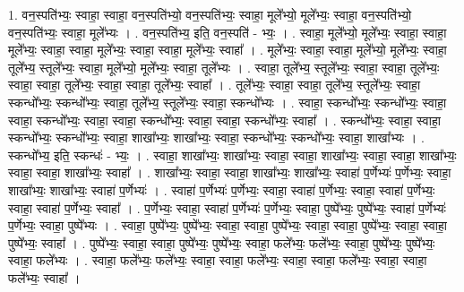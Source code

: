 \documentclass[17pt]{extarticle}
\begin{document}
1. वन॒स्पति॑भ्यः॒ स्वाहा॒ स्वाहा॒ वन॒स्पति॑भ्यो॒ वन॒स्पति॑भ्यः॒ स्वाहा॒ मूले᳚भ्यो॒ मूले᳚भ्यः॒ स्वाहा॒ वन॒स्पति॑भ्यो॒ वन॒स्पति॑भ्यः॒ स्वाहा॒ मूले᳚भ्यः । . वन॒स्पति॑भ्य॒ इति॒ वन॒स्पति॑ - भ्यः॒ । . स्वाहा॒ मूले᳚भ्यो॒ मूले᳚भ्यः॒ स्वाहा॒ स्वाहा॒ मूले᳚भ्यः॒ स्वाहा॒ स्वाहा॒ मूले᳚भ्यः॒ स्वाहा॒ स्वाहा॒ मूले᳚भ्यः॒ स्वाहा᳚ । . मूले᳚भ्यः॒ स्वाहा॒ स्वाहा॒ मूले᳚भ्यो॒ मूले᳚भ्यः॒ स्वाहा॒ तूले᳚भ्य॒ स्तूले᳚भ्यः॒ स्वाहा॒ मूले᳚भ्यो॒ मूले᳚भ्यः॒ स्वाहा॒ तूले᳚भ्यः । . स्वाहा॒ तूले᳚भ्य॒ स्तूले᳚भ्यः॒ स्वाहा॒ स्वाहा॒ तूले᳚भ्यः॒ स्वाहा॒ स्वाहा॒ तूले᳚भ्यः॒ स्वाहा॒ स्वाहा॒ तूले᳚भ्यः॒ स्वाहा᳚ । . तूले᳚भ्यः॒ स्वाहा॒ स्वाहा॒ तूले᳚भ्य॒ स्तूले᳚भ्यः॒ स्वाहा॒ स्कन्धो᳚भ्यः॒ स्कन्धो᳚भ्यः॒ स्वाहा॒ तूले᳚भ्य॒ स्तूले᳚भ्यः॒ स्वाहा॒ स्कन्धो᳚भ्यः । . स्वाहा॒ स्कन्धो᳚भ्यः॒ स्कन्धो᳚भ्यः॒ स्वाहा॒ स्वाहा॒ स्कन्धो᳚भ्यः॒ स्वाहा॒ स्वाहा॒ स्कन्धो᳚भ्यः॒ स्वाहा॒ स्वाहा॒ स्कन्धो᳚भ्यः॒ स्वाहा᳚ । . स्कन्धो᳚भ्यः॒ स्वाहा॒ स्वाहा॒ स्कन्धो᳚भ्यः॒ स्कन्धो᳚भ्यः॒ स्वाहा॒ शाखा᳚भ्यः॒ शाखा᳚भ्यः॒ स्वाहा॒ स्कन्धो᳚भ्यः॒ स्कन्धो᳚भ्यः॒ स्वाहा॒ शाखा᳚भ्यः । . स्कन्धो᳚भ्य॒ इति॒ स्कन्धः॑ - भ्यः॒ । . स्वाहा॒ शाखा᳚भ्यः॒ शाखा᳚भ्यः॒ स्वाहा॒ स्वाहा॒ शाखा᳚भ्यः॒ स्वाहा॒ स्वाहा॒ शाखा᳚भ्यः॒ स्वाहा॒ स्वाहा॒ शाखा᳚भ्यः॒ स्वाहा᳚ । . शाखा᳚भ्यः॒ स्वाहा॒ स्वाहा॒ शाखा᳚भ्यः॒ शाखा᳚भ्यः॒ स्वाहा॑ प॒र्णेभ्यः॑ प॒र्णेभ्यः॒ स्वाहा॒ शाखा᳚भ्यः॒ शाखा᳚भ्यः॒ स्वाहा॑ प॒र्णेभ्यः॑ । . स्वाहा॑ प॒र्णेभ्यः॑ प॒र्णेभ्यः॒ स्वाहा॒ स्वाहा॑ प॒र्णेभ्यः॒ स्वाहा॒ स्वाहा॑ प॒र्णेभ्यः॒ स्वाहा॒ स्वाहा॑ प॒र्णेभ्यः॒ स्वाहा᳚ । . प॒र्णेभ्यः॒ स्वाहा॒ स्वाहा॑ प॒र्णेभ्यः॑ प॒र्णेभ्यः॒ स्वाहा॒ पुष्पे᳚भ्यः॒ पुष्पे᳚भ्यः॒ स्वाहा॑ प॒र्णेभ्यः॑ प॒र्णेभ्यः॒ स्वाहा॒ पुष्पे᳚भ्यः । . स्वाहा॒ पुष्पे᳚भ्यः॒ पुष्पे᳚भ्यः॒ स्वाहा॒ स्वाहा॒ पुष्पे᳚भ्यः॒ स्वाहा॒ स्वाहा॒ पुष्पे᳚भ्यः॒ स्वाहा॒ स्वाहा॒ पुष्पे᳚भ्यः॒ स्वाहा᳚ । . पुष्पे᳚भ्यः॒ स्वाहा॒ स्वाहा॒ पुष्पे᳚भ्यः॒ पुष्पे᳚भ्यः॒ स्वाहा॒ फले᳚भ्यः॒ फले᳚भ्यः॒ स्वाहा॒ पुष्पे᳚भ्यः॒ पुष्पे᳚भ्यः॒ स्वाहा॒ फले᳚भ्यः । . स्वाहा॒ फले᳚भ्यः॒ फले᳚भ्यः॒ स्वाहा॒ स्वाहा॒ फले᳚भ्यः॒ स्वाहा॒ स्वाहा॒ फले᳚भ्यः॒ स्वाहा॒ स्वाहा॒ फले᳚भ्यः॒ स्वाहा᳚ । \newline
\end{document}
